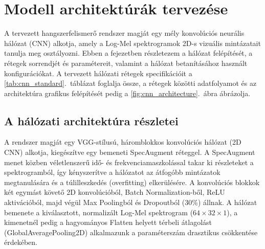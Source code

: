 \section{Modell architektúrák tervezése}
\label{sec:cnn_architecture}

A tervezett hangszerfelismerő rendszer magját egy mély konvolúciós neurális hálózat (CNN) alkotja, amely a Log-Mel spektrogramok 2D-s vizuális mintázatait tanulja meg osztályozni. Ebben a fejezetben részletezem a hálózat felépítését, a rétegek sorrendjét és paramétereit, valamint a hálózat betanításához használt konfigurációkat. A tervezett hálózati rétegek specifikációit a \ref{tab:cnn_standard}.~táblázat foglalja össze, a rétegek közötti adatfolyamot és az architektúra grafikus felépítését pedig a \ref{fig:cnn_architecture}.~ábra ábrázolja.

\subsection{A hálózati architektúra részletei}
\label{subsec:cnn_details}

A rendszer magját egy VGG-stílusú, háromblokkos konvolúciós hálózat (2D CNN) alkotja, kiegészítve egy bemeneti SpecAugment réteggel. A SpecAugment menet közben véletlenszerű idő- és frekvenciamaszkolással takar ki részleteket a spektrogramból, így kényszerítve a hálózatot az átfogóbb mintázatok megtanulására és a túlilleszkedés (overfitting) elkerülésére. A konvolúciós blokkok két egymást követő 2D konvolúcióból, Batch Normalization-ből, ReLU aktivációból, majd végül Max Poolingból és Dropoutból (30\%) állnak. A hálózat bemenete a kiválasztott, normalizált Log-Mel spektrogram ($64 \times 32 \times 1$), a kimenetnél pedig a hagyományos Flatten helyett térbeli átlagolást (GlobalAveragePooling2D) alkalmazunk a paraméterszám drasztikus csökkentése érdekében.

